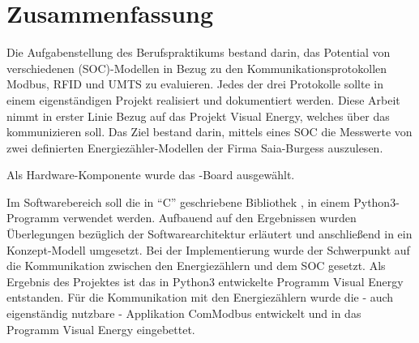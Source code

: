 \documentclass[Bachelorarbeit.tex]{subfiles}
\begin{document}
\chapter*{Zusammenfassung}
Die Aufgabenstellung des Berufspraktikums bestand darin, das Potential von verschiedenen  (SOC)-Modellen in Bezug zu den Kommunikationsprotokollen Modbus, \ac{RFID} und \ac{UMTS} zu evaluieren. Jedes der drei Protokolle sollte in einem eigenständigen Projekt realisiert und dokumentiert werden.  
Diese Arbeit nimmt in erster Linie Bezug auf das Projekt Visual Energy, welches über das   kommunizieren soll. Das Ziel bestand darin, mittels eines \acs{SOC} die Messwerte von zwei definierten Energiezähler-Modellen der Firma Saia-Burgess auszulesen.
\begin{comment}
Auf Grund der durchgeführten \nameref{chap:state_of_the_art}-Analyse fiel hardware-seitig die Entscheidung zu Gunsten des \nameref{para:gnublin}-Boards  aus.
\end{comment}
Als Hardware-Komponente wurde das -Board ausgewählt.
\begin{comment}
Im Softwarebereich kristallisierte sich die in "`C"' geschriebene Bibliothek \nameref{para:libmodbus} heraus, welche in einem Python3 Programm verwendet werden sollte. 
\end{comment}
Im Softwarebereich soll die in "`C"' geschriebene Bibliothek , in einem Python3-Programm verwendet werden. 
Aufbauend auf den Ergebnissen wurden Überlegungen bezüglich der Softwarearchitektur erläutert und anschließend in ein Konzept-Modell umgesetzt. 
Bei der Implementierung  wurde der Schwerpunkt auf die Kommunikation zwischen den Energiezählern und dem \ac{SOC} gesetzt.  
Als Ergebnis des Projektes ist das in Python3 entwickelte Programm Visual Energy entstanden. Für die Kommunikation mit den Energiezählern wurde die - auch eigenständig nutzbare - Applikation ComModbus entwickelt und in das Programm Visual Energy eingebettet.
\end{document}
